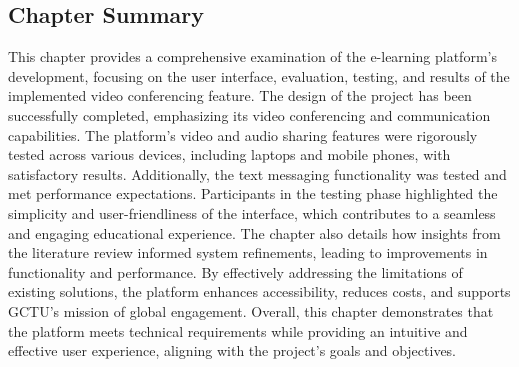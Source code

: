 \documentclass[a4paper,12pt]{article}  %
\begin{document}
\subsection{Chapter Summary}
This chapter provides a comprehensive examination of the e-learning platform's development, focusing on the user interface, evaluation, testing, and results of the implemented video conferencing feature. The design of the project has been successfully completed, emphasizing its video conferencing and communication capabilities. The platform’s video and audio sharing features were rigorously tested across various devices, including laptops and mobile phones, with satisfactory results. Additionally, the text messaging functionality was tested and met performance expectations. Participants in the testing phase highlighted the simplicity and user-friendliness of the interface, which contributes to a seamless and engaging educational experience. The chapter also details how insights from the literature review informed system refinements, leading to improvements in functionality and performance. By effectively addressing the limitations of existing solutions, the platform enhances accessibility, reduces costs, and supports GCTU’s mission of global engagement. Overall, this chapter demonstrates that the platform meets technical requirements while providing an intuitive and effective user experience, aligning with the project's goals and objectives.\\

\newpage


\end{document}
